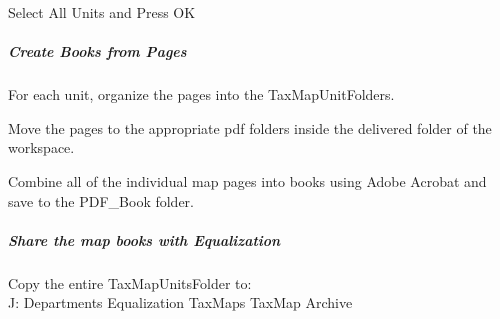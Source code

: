 Select All Units and Press OK
\clearpage
\subparagraph{Create Books from Pages}

For each unit, organize the pages into the TaxMapUnitFolders.

\noindent Move the pages to the appropriate pdf folders inside the delivered folder of the workspace.

\noindent Combine all of the individual map pages into books using Adobe Acrobat and save to the PDF\_Book folder.

\subparagraph{Share the map books with Equalization}

Copy the entire TaxMapUnitsFolder to:\\
J: {\menuArrow} Departments {\menuArrow} Equalization {\menuArrow} TaxMaps {\menuArrow} TaxMap Archive


